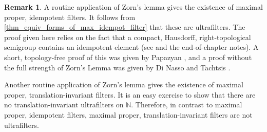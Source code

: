 \documentclass[letter,11pt]{article}
\theoremstyle{plain}
\theoremstyle{definition}
\newtheorem{remark}[theorem]{Remark}
\theoremstyle{plain}
\theoremstyle{plain}
\numberwithin{equation}{section}
\newcommand{\N}{\mathbb{N}}
\begin{document}
\begin{remark}
\label{rmk_idempotents_without_zorn}
    A routine application of Zorn's lemma gives the existence of maximal proper, idempotent filters.  It follows from \cref{thm_equiv_forms_of_max_idempot_filter} that these are ultrafilters.  The proof given here relies on the fact that a compact, Hausdorff, right-topological semigroup contains an idempotent element (see \cite[Thm. 2.5]{hindman_strauss_book_2012} and the end-of-chapter notes). A short, topology-free proof of this was given by Papazyan \cite{papazyan_1989}, and a proof without the full strength of Zorn's Lemma was given by Di Nasso and Tachtsis \cite{dinasso_tachtsis_2018}.

    Another routine application of Zorn's lemma gives the existence of maximal proper, translation-invariant filters.  It is an easy exercise to show that there are no translation-invariant ultrafilters on $\N$.  Therefore, in contrast to maximal proper, idempotent filters, maximal proper, translation-invariant filters are not ultrafilters.
\end{remark}
\end{document}
